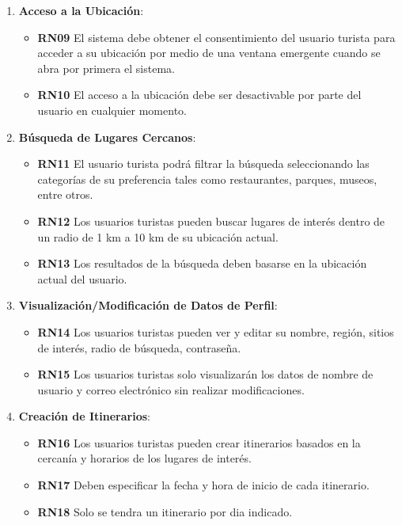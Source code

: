 \documentclass{article}
\begin{document}
\begin{enumerate}
    \item \textbf{Acceso a la Ubicación}:
    \begin{itemize}
        \item \textbf{RN09} El sistema debe obtener el consentimiento del usuario turista para acceder a su ubicación por medio de una ventana emergente cuando se abra por primera el sistema.
        \item \textbf{RN10} El acceso a la ubicación debe ser desactivable por parte del usuario en cualquier momento.
    \end{itemize}
    
    \item \textbf{Búsqueda de Lugares Cercanos}:
    \begin{itemize}
        \item \textbf{RN11} El usuario turista podrá filtrar la búsqueda seleccionando las categorías de su preferencia tales como restaurantes, parques, museos, entre otros.
        \item \textbf{RN12} Los usuarios turistas pueden buscar lugares de interés dentro de un radio de 1 km a 10 km de su ubicación actual.
        \item \textbf{RN13} Los resultados de la búsqueda deben basarse en la ubicación actual del usuario.
    \end{itemize}
    

    
    \item \textbf{Visualización/Modificación de Datos de Perfil}:
    \begin{itemize}
        \item \textbf{RN14} Los usuarios turistas pueden ver y editar su nombre, región, sitios de interés, radio de búsqueda, contraseña.
        \item \textbf{RN15} Los usuarios turistas solo visualizarán los datos de nombre de usuario y correo electrónico sin realizar modificaciones.
    \end{itemize}

    \item \textbf{Creación de Itinerarios}:
    \begin{itemize}
        \item \textbf{RN16} Los usuarios turistas pueden crear itinerarios basados en la cercanía y horarios de los lugares de interés.
        \item \textbf{RN17} Deben especificar la fecha y hora de inicio de cada itinerario.
        \item\textbf{RN18}  Solo se tendra un itinerario por dia indicado.
         

\end{itemize}
\end{enumerate}
\end{document}
